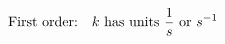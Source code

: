 \documentclass[preview]{standalone}
\begin{document}
\begin{align*}
\special{dvisvgm:raw <g id='unique000'>}\text{First order:} \quad k \text{ has units } \frac{1}{s} \text{ or } s^{-1}\special{dvisvgm:raw </g>}
\end{align*}
\end{document}
